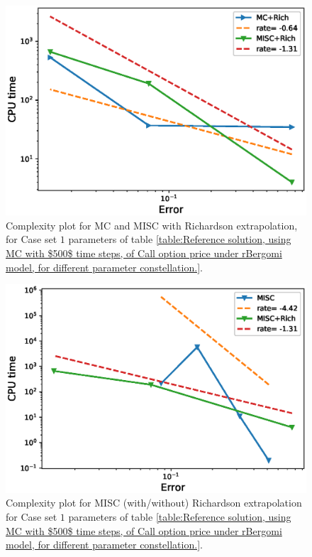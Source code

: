 \documentclass[11pt]{article}
\begin{document}
\begin{figure}[h!]
	\centering
	\includegraphics[width=0.7\linewidth]{./figures/rBergomi_Complexity_rates/set1/error_vs_time_set1_rich}
	
	\caption{Complexity plot for  MC and MISC with Richardson extrapolation, for Case set $1$ parameters of table \ref{table:Reference solution, using MC with $500$ time steps, of Call option price under rBergomi model, for different parameter constellation.}.}
	\label{fig:Complexity plot for MC and MISC for Case set $1$ parameters, richardson}
\end{figure}


\begin{figure}[h!]
	\centering
	\includegraphics[width=0.7\linewidth]{./figures/rBergomi_Complexity_rates/set1/error_vs_time_set1_comparison}
	
	\caption{Complexity plot for  MISC (with/without) Richardson extrapolation for Case set $1$ parameters of table \ref{table:Reference solution, using MC with $500$ time steps, of Call option price under rBergomi model, for different parameter constellation.}.}
	\label{fig:Complexity plot for  MISC for Case set $1$ parameters, comparison}
\end{figure}

\FloatBarrier
\end{document}
